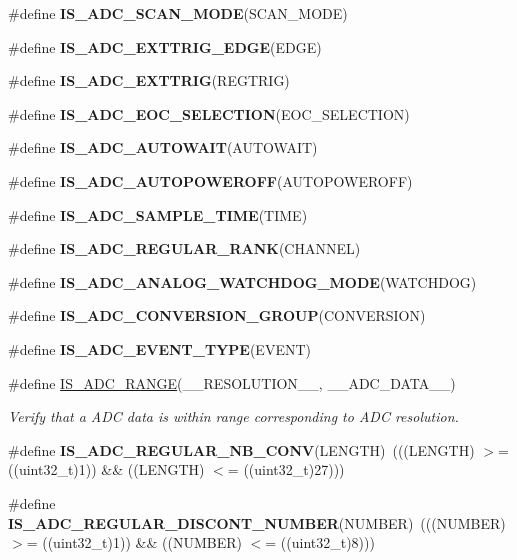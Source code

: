 \begin{DoxyCompactItemize}
$$\item 
\#define {\bfseries I\-S\-\_\-\-A\-D\-C\-\_\-\-S\-C\-A\-N\-\_\-\-M\-O\-D\-E}(S\-C\-A\-N\-\_\-\-M\-O\-D\-E)
\item 
\#define {\bfseries I\-S\-\_\-\-A\-D\-C\-\_\-\-E\-X\-T\-T\-R\-I\-G\-\_\-\-E\-D\-G\-E}(E\-D\-G\-E)
\item 
\#define {\bfseries I\-S\-\_\-\-A\-D\-C\-\_\-\-E\-X\-T\-T\-R\-I\-G}(R\-E\-G\-T\-R\-I\-G)
\item 
\#define {\bfseries I\-S\-\_\-\-A\-D\-C\-\_\-\-E\-O\-C\-\_\-\-S\-E\-L\-E\-C\-T\-I\-O\-N}(E\-O\-C\-\_\-\-S\-E\-L\-E\-C\-T\-I\-O\-N)
\item 
\#define {\bfseries I\-S\-\_\-\-A\-D\-C\-\_\-\-A\-U\-T\-O\-W\-A\-I\-T}(A\-U\-T\-O\-W\-A\-I\-T)
\item 
\#define {\bfseries I\-S\-\_\-\-A\-D\-C\-\_\-\-A\-U\-T\-O\-P\-O\-W\-E\-R\-O\-F\-F}(A\-U\-T\-O\-P\-O\-W\-E\-R\-O\-F\-F)
\item 
\#define {\bfseries I\-S\-\_\-\-A\-D\-C\-\_\-\-S\-A\-M\-P\-L\-E\-\_\-\-T\-I\-M\-E}(T\-I\-M\-E)
\item 
\#define {\bfseries I\-S\-\_\-\-A\-D\-C\-\_\-\-R\-E\-G\-U\-L\-A\-R\-\_\-\-R\-A\-N\-K}(C\-H\-A\-N\-N\-E\-L)
\item 
\#define {\bfseries I\-S\-\_\-\-A\-D\-C\-\_\-\-A\-N\-A\-L\-O\-G\-\_\-\-W\-A\-T\-C\-H\-D\-O\-G\-\_\-\-M\-O\-D\-E}(W\-A\-T\-C\-H\-D\-O\-G)
\item 
\#define {\bfseries I\-S\-\_\-\-A\-D\-C\-\_\-\-C\-O\-N\-V\-E\-R\-S\-I\-O\-N\-\_\-\-G\-R\-O\-U\-P}(C\-O\-N\-V\-E\-R\-S\-I\-O\-N)
\item 
\#define {\bfseries I\-S\-\_\-\-A\-D\-C\-\_\-\-E\-V\-E\-N\-T\-\_\-\-T\-Y\-P\-E}(E\-V\-E\-N\-T)
\item 
\#define \hyperlink{group___a_d_c___private___macros_ga389d36dc9dadf5e1c0f085751812c1d8}{I\-S\-\_\-\-A\-D\-C\-\_\-\-R\-A\-N\-G\-E}(\-\_\-\-\_\-\-R\-E\-S\-O\-L\-U\-T\-I\-O\-N\-\_\-\-\_\-, \-\_\-\-\_\-\-A\-D\-C\-\_\-\-D\-A\-T\-A\-\_\-\-\_\-)
\begin{DoxyCompactList}\small\item\em Verify that a A\-D\-C data is within range corresponding to A\-D\-C resolution. \end{DoxyCompactList}\item 
\hypertarget{group___a_d_c___private___macros_ga81fb7f617e88ad4d86c25f040dcbc12f}{\#define {\bfseries I\-S\-\_\-\-A\-D\-C\-\_\-\-R\-E\-G\-U\-L\-A\-R\-\_\-\-N\-B\-\_\-\-C\-O\-N\-V}(L\-E\-N\-G\-T\-H)~(((L\-E\-N\-G\-T\-H) $>$= ((uint32\-\_\-t)1)) \&\& ((L\-E\-N\-G\-T\-H) $<$= ((uint32\-\_\-t)27)))}\label{group___a_d_c___private___macros_ga81fb7f617e88ad4d86c25f040dcbc12f}

\item 
\hypertarget{group___a_d_c___private___macros_ga5883ebe5aa1b4424a532439dbb2e9428}{\#define {\bfseries I\-S\-\_\-\-A\-D\-C\-\_\-\-R\-E\-G\-U\-L\-A\-R\-\_\-\-D\-I\-S\-C\-O\-N\-T\-\_\-\-N\-U\-M\-B\-E\-R}(N\-U\-M\-B\-E\-R)~(((N\-U\-M\-B\-E\-R) $>$= ((uint32\-\_\-t)1)) \&\& ((N\-U\-M\-B\-E\-R) $<$= ((uint32\-\_\-t)8)))}\label{group___a_d_c___private___macros_ga5883ebe5aa1b4424a532439dbb2e9428}

\end{DoxyCompactItemize}


